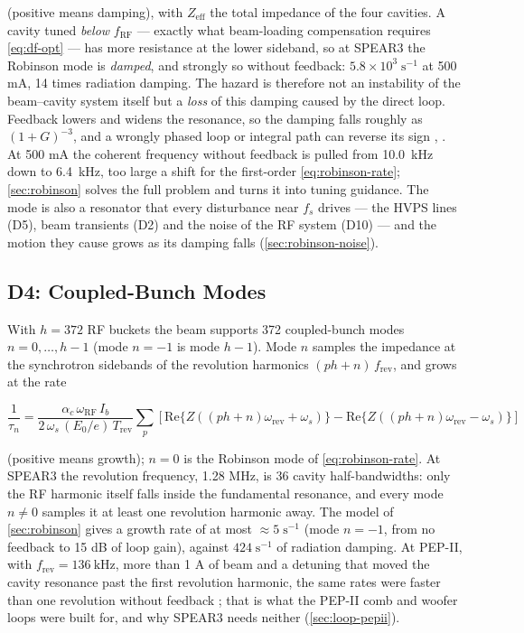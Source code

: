 (positive means damping), with \(Z_\text{eff}\) the total impedance of the four cavities. A cavity tuned \emph{below} \(f_\text{RF}\) --- exactly what beam-loading compensation requires \eqref{eq:df-opt} --- has more resistance at the lower sideband, so at SPEAR3 the Robinson mode is \emph{damped}, and strongly so without feedback: \(5.8\times10^{3}\;\text{s}^{-1}\) at 500 mA, 14 times radiation damping. The hazard is therefore not an instability of the beam--cavity system itself but a \emph{loss} of this damping caused by the direct loop. Feedback lowers and widens the resonance, so the damping falls roughly as \((1+G)^{-3}\), and a wrongly phased loop or integral path can reverse its sign , . At 500 mA the coherent frequency without feedback is pulled from \qty{10.0}{\kilo\hertz} down to \qty{6.4}{\kilo\hertz}, too large a shift for the first-order \cref{eq:robinson-rate}; \cref{sec:robinson} solves the full problem and turns it into tuning guidance. The mode is also a resonator that every disturbance near \(f_s\) drives --- the HVPS lines (D5), beam transients (D2) and the noise of the RF system (D10) --- and the motion they cause grows as its damping falls (\cref{sec:robinson-noise}).

\subsection{D4: Coupled-Bunch Modes}\label{sec:d4}


With \(h = 372\) RF buckets the beam supports 372 coupled-bunch modes \(n = 0, \ldots, h-1\) (mode \(n = -1\) is mode \(h-1\)). Mode \(n\) samples the impedance at the synchrotron sidebands of the revolution harmonics \((ph+n)\,f_\text{rev}\), and grows at the rate 

\begin{equation}\label{eq:cb-mode}
\frac{1}{\tau_n} = \frac{\alpha_c\,\omega_\text{RF}\,I_b}{2\,\omega_s\,(E_0/e)\,T_\text{rev}}\sum_p\left[\text{Re}\{Z((ph+n)\omega_\text{rev}+\omega_s)\} - \text{Re}\{Z((ph+n)\omega_\text{rev}-\omega_s)\}\right]
\end{equation}

(positive means growth); \(n = 0\) is the Robinson mode of \cref{eq:robinson-rate}. At SPEAR3 the revolution frequency, 1.28 MHz, is 36 cavity half-bandwidths: only the RF harmonic itself falls inside the fundamental resonance, and every mode \(n \neq 0\) samples it at least one revolution harmonic away. The model of \cref{sec:robinson} gives a growth rate of at most \(\approx 5\;\text{s}^{-1}\) (mode \(n = -1\), from no feedback to 15 dB of loop gain), against \(424\;\text{s}^{-1}\) of radiation damping. At PEP-II, with \(f_\text{rev} = \qty{136}{\kilo\hertz}\), more than 1 A of beam and a detuning that moved the cavity resonance past the first revolution harmonic, the same rates were faster than one revolution without feedback ; that is what the PEP-II comb and woofer loops were built for, and why SPEAR3 needs neither (\cref{sec:loop-pepii}).

